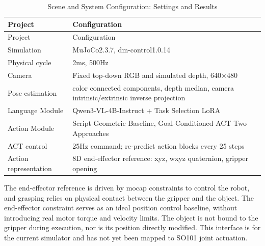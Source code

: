 \FloatBarrier\begingroup\small\setlength{\tabcolsep}{2.5pt}
\begin{longtable}[]{@{}
  >{\raggedright\arraybackslash}p{}
  >{\raggedright\arraybackslash}p{}@{}}
\caption{Scene and System Configuration: Settings and Results}\label{tab:s05-1}\tabularnewline
\toprule\noalign{}
\begin{minipage}[b]{\linewidth}\raggedright
Project
\end{minipage} & \begin{minipage}[b]{\linewidth}\raggedright
Configuration
\end{minipage} \\
\midrule\noalign{}
\endfirsthead
\toprule\noalign{}
\begin{minipage}[b]{\linewidth}\raggedright
Project
\end{minipage} & \begin{minipage}[b]{\linewidth}\raggedright
Configuration
\end{minipage} \\
\midrule\noalign{}
\endhead
\bottomrule\noalign{}
\endlastfoot
Simulation & MuJoCo2.3.7, dm-control1.0.14 \\
Physical cycle & 2ms, 500Hz \\
Camera & Fixed top-down RGB and simulated depth, 640\(\times\)480 \\
Pose estimation & color connected components, depth median, camera intrinsic/extrinsic inverse projection \\
Language Module & Qwen3-VL-4B-Instruct + Task Selection LoRA \\
Action Module & Script Geometric Baseline, Goal-Conditioned ACT Two Approaches \\
ACT control & 25Hz command; re-predict action blocks every 25 steps \\
Action representation & 8D end-effector reference: xyz, wxyz quaternion, gripper opening \\
\end{longtable}\endgroup

The end-effector reference is driven by mocap constraints to control the robot, and grasping relies on physical contact between the gripper and the object. The end-effector constraint serves as an ideal position control baseline, without introducing real motor torque and velocity limits. The object is not bound to the gripper during execution, nor is its position directly modified. This interface is for the current simulator and has not yet been mapped to SO101 joint actuation.

